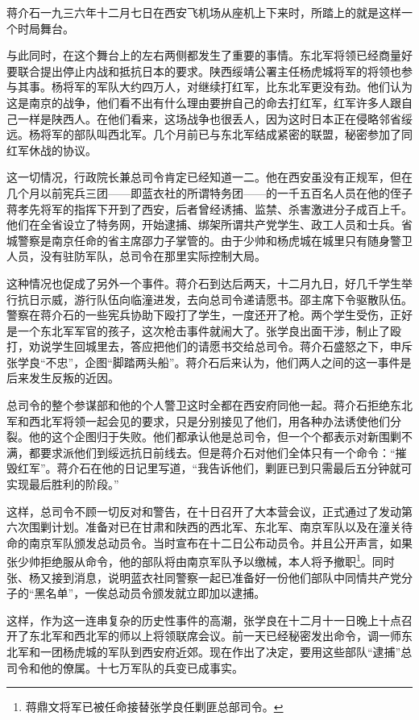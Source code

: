 \documentclass[10pt]{book}
\begin{document}
蒋介石一九三六年十二月七日在西安飞机场从座机上下来时，所踏上的就是这样一个时局舞台。

与此同时，在这个舞台上的左右两侧都发生了重要的事情。东北军将领已经商量好要联合提出停止内战和抵抗日本的要求。陕西绥靖公署主任杨虎城将军的将领也参与其事。杨将军的军队大约四万人，对继续打红军，比东北军更没有劲。他们认为这是南京的战争，他们看不出有什么理由要拚自己的命去打红军，红军许多人跟自己一样是陕西人。在他们看来，这场战争也很丢人，因为这时日本正在侵略邻省绥远。杨将军的部队叫西北军。几个月前已与东北军结成紧密的联盟，秘密参加了同红军休战的协议。

这一切情况，行政院长兼总司令肯定已经知道一二。他在西安虽没有正规军，但在几个月以前宪兵三团——即蓝衣社的所谓特务团——的一千五百名人员在他的侄子蒋孝先将军的指挥下开到了西安，后者曾经诱捕、监禁、杀害激进分子成百上千。他们在全省设立了特务网，开始逮捕、绑架所谓共产党学生、政工人员和士兵。省城警察是南京任命的省主席邵力子掌管的。由于少帅和杨虎城在城里只有随身警卫人员，没有驻防军队，总司令在那里实际控制大局。

这种情况也促成了另外一个事件。蒋介石到达后两天，十二月九日，好几千学生举行抗日示威，游行队伍向临潼进发，去向总司令递请愿书。邵主席下令驱散队伍。警察在蒋介石的一些宪兵协助下殴打了学生，一度还开了枪。两个学生受伤，正好是一个东北军军官的孩子，这次枪击事件就闹大了。张学良出面干涉，制止了殴打，劝说学生回城里去，答应把他们的请愿书交给总司令。蒋介石盛怒之下，申斥张学良“不忠”，企图“脚踏两头船”。蒋介石后来认为，他们两人之间的这一事件是后来发生反叛的近因。

总司令的整个参谋部和他的个人警卫这时全都在西安府同他一起。蒋介石拒绝东北军和西北军将领一起会见的要求，只是分别接见了他们，用各种办法诱使他们分裂。他的这个企图归于失败。他们都承认他是总司令，但一个个都表示对新围剿不满，都要求派他们到绥远抗日前线去。但是蒋介石对他们全体只有一个命令：“摧毁红军”。蒋介石在他的日记里写道，“我告诉他们，剿匪已到只需最后五分钟就可实现最后胜利的阶段。”

这样，总司令不顾一切反对和警告，在十日召开了大本营会议，正式通过了发动第六次围剿计划。准备对已在甘肃和陕西的西北军、东北军、南京军队以及在潼关待命的南京军队颁发总动员令。当时宣布在十二日公布动员令。并且公开声言，如果张少帅拒绝服从命令，他的部队将由南京军队予以缴械，本人将予撤职\footnote{蒋鼎文将军已被任命接替张学良任剿匪总部司令。}。同时张、杨又接到消息，说明蓝衣社同警察一起已准备好一份他们部队中同情共产党分子的“黑名单”，一俟总动员令颁发就立即加以逮捕。

这样，作为这一连串复杂的历史性事件的高潮，张学良在十二月十一日晚上十点召开了东北军和西北军的师以上将领联席会议。前一天已经秘密发出命令，调一师东北军和一团杨虎城的军队到西安府近郊。现在作出了决定，要用这些部队“逮捕”总司令和他的僚属。十七万军队的兵变已成事实。
\end{document}
